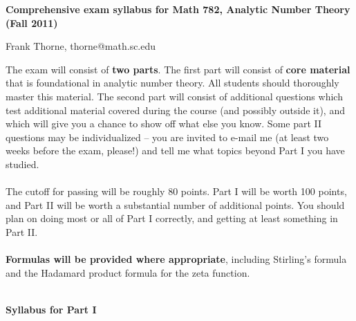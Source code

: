 \documentclass[12pt]{article}
\begin{document}
\setlength{\topmargin}{-2mm}





\begin{center}{\bf Comprehensive exam syllabus for Math 782, Analytic Number Theory (Fall 2011)}
\end{center}
\begin{center}Frank Thorne, thorne@math.sc.edu
\end{center}

The exam will consist of {\bf two parts}. The first part will consist of {\bf core material} that is
foundational in analytic number theory. All students should thoroughly master this material. The second
part will consist of additional questions which test additional material covered during the course
(and possibly outside it), and which will give you a chance to show off what else you know. Some part II 
questions may be individualized -- you are invited to e-mail me (at least two weeks before the exam, please!) 
and tell me what topics beyond Part I you have studied.
\\
\\
The cutoff for passing will be roughly 80 points. Part I will be worth 100 points, and Part II will be worth
a substantial number of additional points. 
You should plan on doing most or all of Part I correctly, and getting at least something
in Part II.
\\
\\
{\bf Formulas will be provided where appropriate}, including Stirling's formula and the Hadamard product formula
for the zeta function.
\\
\\
\begin{center}
{\bf Syllabus for Part I}
\end{center}
\end{document}
